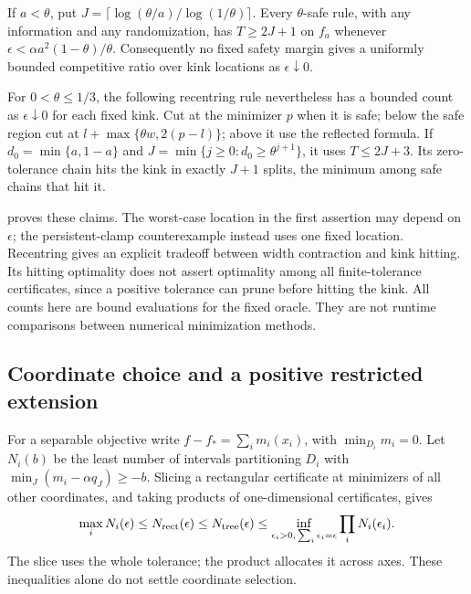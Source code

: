 \begin{proposition}
\label{branching:recentring}
If $a<\theta$, put
$J=\lceil\log(\theta/a)/\log(1/\theta)\rceil$.
Every $\theta$-safe rule, with any information and any randomization,
has $T\ge2J+1$ on $f_a$ whenever
$\epsilon<\alpha a^2(1-\theta)/\theta$.
Consequently no fixed safety margin gives a uniformly bounded competitive
ratio over kink locations as $\epsilon\downarrow0$.

For $0<\theta\le1/3$, the following recentring rule nevertheless has a
bounded count as $\epsilon\downarrow0$ for each fixed kink. Cut at the
minimizer $p$ when it is safe; below the safe region cut at
$l+\max\{\theta w,2(p-l)\}$; above it use the reflected formula.
If $d_0=\min\{a,1-a\}$ and
$J=\min\{j\ge0:d_0\ge\theta^{j+1}\}$, it uses
$T\le2J+3$. Its zero-tolerance chain hits the kink in exactly $J+1$
splits, the minimum among safe chains that hit it.
\end{proposition}

 proves these claims. The worst-case location
in the first assertion may depend on $\epsilon$; the persistent-clamp
counterexample instead uses one fixed location. Recentring gives an
explicit tradeoff between width contraction and kink hitting. Its hitting
optimality does not assert optimality among all finite-tolerance
certificates, since a positive tolerance can prune before hitting the kink.
All counts here are bound evaluations for the fixed oracle. They are not
runtime comparisons between numerical minimization methods.

\subsection{Coordinate choice and a positive restricted extension}

For a separable objective write
$f-f_* =\sum_i m_i(x_i)$, with $\min_{D_i}m_i=0$.
Let $N_i(b)$ be the least number of intervals partitioning $D_i$ with
$\min_J(m_i-\alpha q_J)\ge-b$. Slicing a rectangular certificate at
minimizers of all other coordinates, and taking products of one-dimensional
certificates, gives
\begin{equation}
 \max_iN_i(\epsilon)\le N_{\rm rect}(\epsilon)
 \le N_{\rm tree}(\epsilon)
 \le\inf_{\epsilon_i>0,\,\sum_i\epsilon_i=\epsilon}
                                      \prod_iN_i(\epsilon_i).
 \label{branching:separable-brackets}
\end{equation}
The slice uses the whole tolerance; the product allocates it across axes.
These inequalities alone do not settle coordinate selection.

